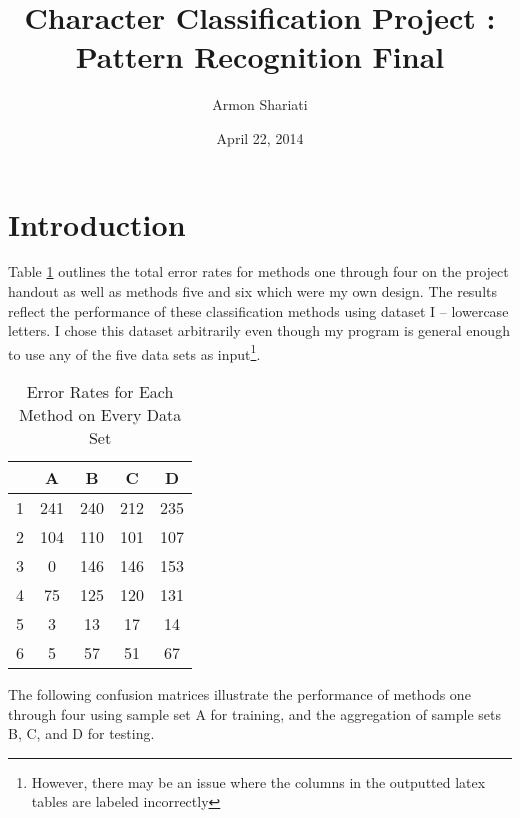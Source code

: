 \documentclass[12pt]{article}
\begin{document}
\title{Character Classification Project : Pattern Recognition Final}
\author{Armon Shariati}
\date{April 22, 2014}
\maketitle

\section{Introduction}

Table \ref{tab:totals} outlines the total error rates for methods one through
four on the project handout as well as methods five and six which were my own
design. The results reflect the performance of these classification methods
using dataset I -- lowercase letters. I chose this dataset arbitrarily even
though my program is general enough to use any of the five data sets as
input\footnote{However, there may be an issue where the columns in the
outputted latex tables are labeled incorrectly}. 

\begin{table}[!ht]
    \centering
    \caption{Error Rates for Each Method on Every Data Set}
    \begin{tabular}{| c | c | c | c | c |} \hline
        & A & B & C & D\\ \hline
      1 & 241 & 240 & 212 & 235\\ \hline
      2 & 104 & 110 & 101 & 107\\ \hline
      3 & 0 & 146 & 146 & 153\\ \hline
      4 & 75 & 125 & 120 & 131\\ \hline
      5 & 3 & 13 & 17 & 14\\ \hline
      6 & 5 & 57 & 51 & 67\\ \hline
    \end{tabular}
    \label{tab:totals}
\end{table}

The following confusion matrices illustrate the performance of methods one
through four using sample set A for training, and the aggregation of sample
sets B, C, and D for testing.
\end{document}
